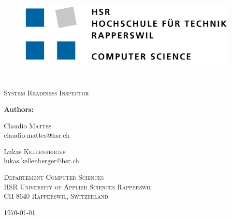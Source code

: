 \begin{titlepage}
	\centering
	\begin{figure}
		\centering
		\includegraphics[width=0.7\linewidth]{./assets/logo/hsr.png}  	
	\end{figure}
	\
	\vfill
	{\huge\bfseries \TITLE\par}
	\vspace{5mm}
	{\scshape\Large System Readiness Inspector\par}
	\vfill

	{\Large\textbf{Authors:} \\\vspace{0.2cm}}
	{\Large Claudio \textsc{Mattes} \\\small claudio.mattes@hsr.ch \par\vspace{0.2cm}
	\Large Lukas \textsc{Kellenberger} \\\small lukas.kellenberger@hsr.ch}


	\vfill
	{\scshape\scriptsize Departement Computer Sciences \\ HSR University of Applied Sciences Rapperswil \\ CH-8640 Rapperswil, Switzerland \par}
	\vfill

    {\large \today}
\end{titlepage}